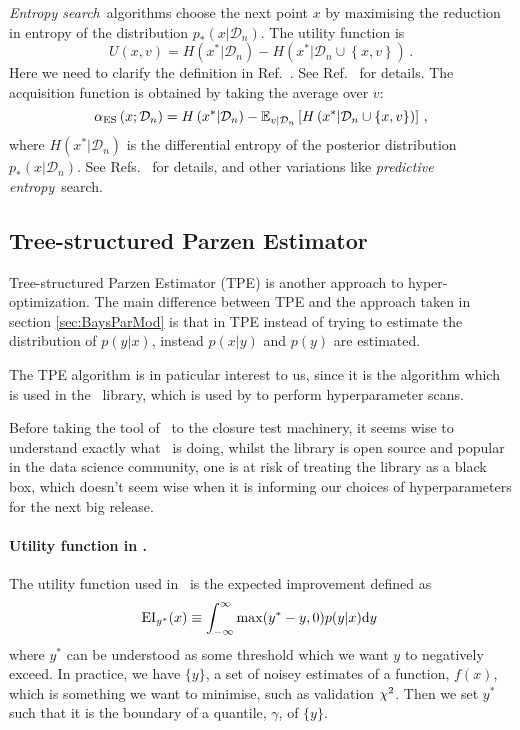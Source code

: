 {\em Entropy search}\ algorithms choose the next point $x$ by maximising the
reduction in entropy of the distribution $p_*(x|\mathcal{D}_n)$. The utility
function is
\begin{equation}
    \label{eq:ESUtil}
    U(x,v) = H\left(x^*|\mathcal{D}_n\right) -
    H\left(x^*|\mathcal{D}_n \cup \left\{x,v\right\}\right)\, .
\end{equation}
Here we need to clarify the definition in Ref.~\cite{shahriari2015taking}. See
Ref.~\cite{hernandez2014predictive} for details. The acquisition function is
obtained by taking the average over $v$:
\begin{equation}
    \label{eq:ESAcq}
    \alpha_\mathrm{ES}\left(x;\mathcal{D}_n\right) =
    H\left(x^*|\mathcal{D}_n\right) -
    \mathbb{E}_{v|\mathcal{D}_n}\left[H\left(x^*|\mathcal{D}_n \cup \left\{x,v\right\}\right)\right]\, ,
\end{equation}
where $H\left(x^*|\mathcal{D}_n\right)$ is the differential entropy of the
posterior distribution $p_*(x|\mathcal{D}_n)$. See
Refs.~\cite{hennig2012entropy,villemonteix2009informational} for details, and
other variations like {\em predictive entropy}\ search.

\subsection{Tree-structured Parzen Estimator}

Tree-structured Parzen Estimator (TPE) is another approach to hyper-optimization.
The main difference between TPE and the approach taken in section \ref{sec:BaysParMod}
is that in TPE instead of trying to estimate the distribution of $p(y|x)$, instead
$p(x|y)$ and $p(y)$ are estimated.

The TPE algorithm is in paticular interest to us, since it is the algorithm which
is used in the \hyperopt\ library, which is used by \nfit to perform hyperparameter
scans.

Before taking the tool of \hyperopt\ to the closure test machinery, it seems wise
to understand exactly what \hyperopt\ is doing, whilst the library is open source
and popular in the data science community, one is at risk of treating the library
as a black box, which doesn't seem wise when it is informing our choices of hyperparameters
for the next big release.

\paragraph[]{Utility function in \hyperopt.} The utility function used in \hyperopt\
is the expected improvement defined as
\begin{equation}
    \label{eq:expectedimp}
    \mathrm{EI}_{y^{*}}(x) \equiv \int_{- \infty}^{\infty} \max(y^{*} - y, 0)p(y|x) {\rm d} y \,
\end{equation}
where $y^{*}$ can be understood as some threshold which we want $y$ to negatively exceed.
In practice, we have $\{y\}$, a set of noisey estimates of a function, $f(x)$, which
is something we want to minimise, such as validation $\chi^{2}$. Then we set $y^*$
such that it is the boundary of a quantile, $\gamma$, of $\{y\}$.

